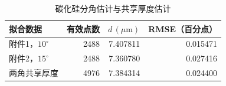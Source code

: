 \begin{table}[htbp]
\centering
\caption{碳化硅分角估计与共享厚度估计}
\label{tab:sic-angles}
\begin{tabular}{lrrr}
\toprule
拟合数据 & 有效点数 & $d\,(\mu\mathrm m)$ & RMSE（百分点）\\
\midrule
附件1，$10^\circ$ & 2488 & 7.407811 & 0.015471\\
附件2，$15^\circ$ & 2488 & 7.360780 & 0.027416\\
两角共享厚度 & 4976 & 7.384314 & 0.024400\\
\bottomrule
\end{tabular}
\end{table}

